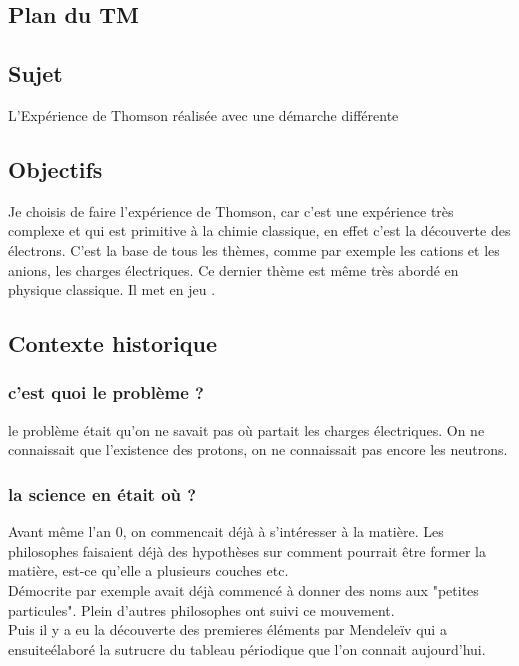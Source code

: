 \documentclass[../main.tex]{subfiles}
\begin{document}
\subsection{Plan du TM}

\subsection{Sujet}
L'Expérience de Thomson réalisée avec une démarche différente 

\subsection{Objectifs}


Je choisis de faire l'expérience de Thomson, car c'est une expérience très complexe et qui est primitive à la chimie classique, en effet c'est la découverte des électrons. C'est la base de tous les thèmes, comme par exemple les cations et les anions, les charges électriques. Ce dernier thème est même très abordé en physique classique. Il met en jeu .
 
 
\subsection{Contexte historique}
\subsubsection{c'est quoi le problème ?}
le problème était qu'on ne savait pas où partait les charges électriques. On ne connaissait que l'existence des protons, on ne connaissait pas encore les neutrons. 

\subsubsection{la science en était où ?}
Avant même l'an 0, on commencait déjà à s'intéresser à la matière.
Les philosophes faisaient déjà des hypothèses sur comment pourrait être former la matière, est-ce qu'elle a plusieurs couches etc. \\
Démocrite par exemple avait déjà commencé à donner des noms aux "petites particules". Plein d'autres philosophes ont suivi ce mouvement.\\
Puis il y a eu la découverte des premieres éléments par Mendeleïv qui a ensuiteélaboré la sutrucre du tableau périodique que l'on connait aujourd'hui.
\end{document}
